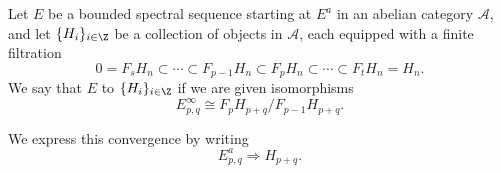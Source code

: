 \documentclass[main.tex]{subfiles}
\begin{document}
\begin{definition}
  \label{def:bounded_convergence}
  Let $E$ be a bounded spectral sequence starting at $E^{a}$ in an abelian category $\mathcal{A}$, and let $\{H_{i}\}_{i \in \Z}$ be a collection of objects in $\mathcal{A}$, each equipped with a finite filtration
  \begin{equation*}
    0 = F_{s}H_{n} \subset \cdots \subset F_{p-1}H_{n} \subset F_{p}H_{n} \subset \cdots \subset F_{t}H_{n} = H_{n}.
  \end{equation*}
  We say that $E$  to $\{H_{i}\}_{i \in \Z}$ if we are given isomorphisms
  \begin{equation*}
    E^{\infty}_{p,q} \cong F_{p}H_{p+q}/F_{p-1}H_{p+q}.
  \end{equation*}

  We express this convergence by writing
  \begin{equation*}
    E^{a}_{p,q} \Rightarrow H_{p+q}.
  \end{equation*}
\end{definition}
\end{document}
